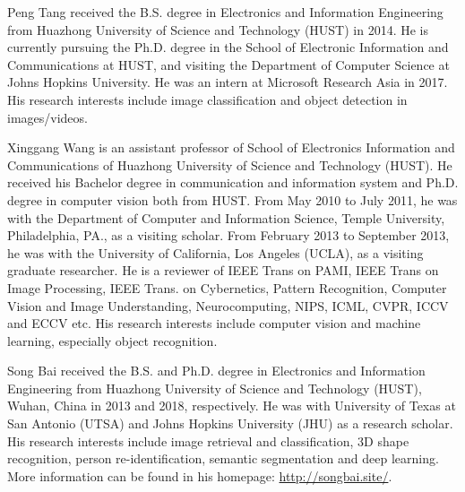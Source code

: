 \documentclass[10pt,journal,compsoc]{IEEEtran}
\begin{document}


\begin{IEEEbiography}{Peng Tang}
received the B.S. degree in Electronics and Information Engineering from Huazhong University of Science and Technology (HUST) in 2014.
He is currently pursuing the Ph.D. degree in the School of Electronic Information and Communications at HUST,
and visiting the Department of Computer Science at Johns Hopkins University.
He was an intern at Microsoft Research Asia in 2017.
His research interests include image classification and object detection in images/videos.
\end{IEEEbiography}

\begin{IEEEbiography}{Xinggang Wang}
is an assistant professor of School of Electronics Information and Communications of Huazhong University of Science and Technology (HUST). He received his Bachelor degree in communication and information system and Ph.D. degree in computer vision both from HUST. From May 2010 to July 2011, he was with the Department of Computer and Information Science, Temple University, Philadelphia, PA., as a visiting scholar. From February 2013 to September 2013, he was with the University of California, Los Angeles (UCLA), as a visiting graduate researcher. He is a reviewer of IEEE Trans on PAMI, IEEE Trans on Image Processing, IEEE Trans. on Cybernetics, Pattern Recognition, Computer Vision and Image Understanding, Neurocomputing, NIPS, ICML, CVPR, ICCV and ECCV etc. His research interests include computer vision and machine learning, especially object recognition.
\end{IEEEbiography}

\begin{IEEEbiography}{Song Bai}
received the B.S. and Ph.D. degree in Electronics and Information Engineering from Huazhong University of Science and Technology (HUST), Wuhan, China in 2013 and 2018, respectively. He was with University of Texas at San Antonio (UTSA) and Johns Hopkins University (JHU) as a research scholar. His research interests include image retrieval and classification, 3D shape recognition, person re-identification, semantic segmentation and deep learning. More information can be found in his homepage: \url{http://songbai.site/}.
\end{IEEEbiography}
\end{document}
